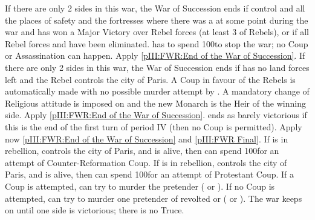 \begin{digressions}
  \phpaix
  \aparag If there are only 2 sides in this war, the War of Succession ends if
  \FRA control \villeParis and all the places of safety and the fortresses
  where there was a \REVOLT\faceplus at some point during the war and has won
  a Major Victory over Rebel forces (at least 3 \DT of Rebels), or if all
  Rebel forces and \REVOLT have been eliminated.
  \bparag \FRA has to spend 100\ducats to stop the war; no Coup or
  Assassination can happen. Apply \ref{pIII:FWR:End of the War of Succession}.
  \aparag If there are only 2 sides in this war, the War of Succession ends if
  \FRA has no land forces left and the Rebel controls the city of Paris. A
  Coup in favour of the Rebels is automatically made with no possible murder
  attempt by \FRA. A mandatory change of Religious attitude is imposed on \FRA
  and the new Monarch is the Heir of the winning side. Apply \ref{pIII:FWR:End
    of the War of Succession}.
  \aparag \FRA ends as barely victorious if this is the end of the first turn
  of period IV (then no Coup is permitted). Apply now \ref{pIII:FWR:End of the
    War of Succession} and \ref{pIII:FWR Final}.
  \aparag If \lig is in rebellion, controls the city of Paris, and
   is alive, then \LIG can spend 100\ducats for an
  attempt of Counter-Reformation Coup.
  \aparag If \hug is in rebellion, controls the city of Paris, and
  \leaderNavarre is alive, then \HUG can spend 100\ducats for an attempt of
  Protestant Coup.
  \aparag If a Coup is attempted, \FRA can try to murder the pretender
  ( or \leaderNavarre).
  \aparag If no Coup is attempted, \FRA can try to murder one pretender of
  revolted \lig or \hug ( or \leaderNavarre).
  \aparag The war keeps on until one side is victorious; there is no Truce.




\end{digressions}
